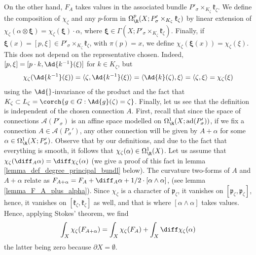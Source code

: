 \begin{obs}
    On the other hand, \(F_A\) takes values in the associated bundle \(P'_\sigma \times _{K_\zeta}\mathfrak{k}_\zeta\). We define the composition of \(\chi_\zeta\) and any \(p\)-form in \(\Omega^p_\R(X; P'_\sigma \times_{K_\zeta} \mathfrak{k}_\zeta)\) by linear extension of \(\chi_\zeta(\alpha \otimes \bm{\xi})=\chi_\zeta(\bm{\xi})\cdot\alpha\), where \(\bm{\xi}\in \Gamma(X; P'_\sigma \times_{K_\zeta}\mathfrak{k}_\zeta)\). Finally, if \(\bm{\xi}(x)=[p, \xi]\in P'_\sigma \times_{K_\zeta}\mathfrak{k}_\zeta\), with \(\pi(p)=x\), we define \(\chi_\zeta(\bm{\xi}(x))=\chi_\zeta(\xi)\). This does not depend on the representative chosen. Indeed, \([p, \xi]=[p\cdot k, \Ad{k^{-1}}(\xi)]\) for \(k \in K_\zeta\), but
    \[
    \chi_\zeta(\Ad{k^{-1}}(\xi))=\langle \zeta, \Ad{k^{-1}}(\xi) \rangle = \langle \Ad{k}(\zeta), \xi \rangle = \langle \zeta, \xi \rangle = \chi_\zeta(\xi)
    \]
    using the \(\Ad{}\)-invariance of the product and the fact that \(K_\zeta \subset L_\zeta=\corch{g\in G: \Ad{g}(\zeta)=\zeta}\). Finally, let us see that the definition is independent of the chosen connection \(A\). First, recall that since the space of connections \(\mathscr{A}(P'_\sigma)\) is an affine space modelled on \(\Omega^1_\R(X; \mathrm{ad}(P_\sigma'))\), if we fix a connection \(A \in \mathscr{A}(P_\sigma')\), any other connection will be given by \(A+\alpha\) for some \(\alpha \in \Omega_\R^1(X; P_\sigma')\). Observe that by our definitions, and due to the fact that everything is smooth, it follows that \(\chi_\zeta(\alpha)\in \Omega_\R^1(X)\). Let us assume that \(\chi_\zeta(\diff_A \alpha)=\diff \chi_\zeta(\alpha)\) (we give a proof of this fact in lemma \ref{lemma_def_degree_principal_bundl} below). The curvature two-forms of \(A\) and \(A+\alpha\) relate as \(F_{A+\alpha}=F_A+\diff_A \alpha + 1/2 \cdot [\alpha \wedge \alpha]\), (see lemma \ref{lemma_F_A_plus_alpha}). Since \(\chi_\zeta\) is a character of \(\mathfrak{p}_\zeta\), it vanishes on \([\mathfrak{p}_\zeta, \mathfrak{p}_\zeta]\), hence, it vanishes on \([\mathfrak{k}_\zeta, \mathfrak{k}_\zeta]\) as well, and that is where \([\alpha \wedge \alpha]\) takes values. Hence, applying Stokes' theorem, we find
    \[
    \int_X \chi_\zeta(F_{A+\alpha})=\int_X \chi_\zeta(F_A) + \int_X \diff \chi_\zeta(\alpha)
    \]
    the latter being zero because \(\partial X=\emptyset\).
\end{obs}


